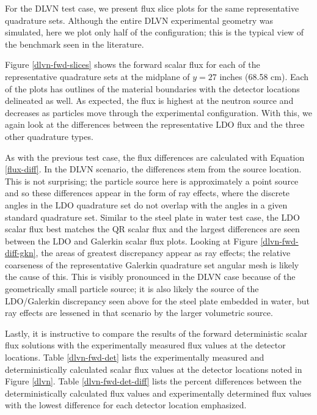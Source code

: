 \documentclass{article} %
\begin{document}
For the DLVN test case, we present flux slice plots for the same representative
quadrature sets. Although the entire DLVN
experimental geometry was simulated, here we plot only half of the
configuration; this is the typical view of the benchmark seen in the
literature.

Figure \ref{dlvn-fwd-slices} shows the forward scalar flux for each of the
representative quadrature sets at the midplane of $y = 27$ inches (68.58 cm).
Each of the plots has outlines of the material boundaries with the detector
locations delineated as well. As expected, the flux is highest at the neutron
source and decreases as particles move through the experimental configuration.
With this, we again look at the differences between the representative LDO flux
and the three other quadrature types. 

As with the previous test case, the flux differences 
are calculated with Equation \ref{flux-diff}. In the DLVN scenario, the 
differences stem from the source location. This is not surprising; the particle
source here is approximately a point source and so these differences appear in
the form of ray effects, where the discrete angles in the LDO quadrature set do
not overlap with the angles in a given standard quadrature set. Similar to the
steel plate in water test case, the LDO scalar flux best matches the QR scalar
flux and the largest differences are seen between the LDO and Galerkin scalar
flux plots. Looking at Figure \ref{dlvn-fwd-diff-gkn}, the areas of greatest
discrepancy appear as ray effects; the relative coarseness of the
representative Galerkin quadrature set angular mesh is likely the cause of
this. This is visibly pronounced in the DLVN case because of the geometrically
small particle source; it is also likely the source of the 
LDO/Galerkin discrepancy seen above for the steel plate embedded in water, but
ray effects are lessened in that scenario by the larger volumetric source.

Lastly, it is instructive to compare the results of the forward deterministic
scalar flux solutions with the experimentally measured flux values at the
detector locations. Table \ref{dlvn-fwd-det} lists the experimentally measured
\cite{dlvn1991} and deterministically calculated scalar flux values at the
detector locations noted in Figure \ref{dlvn}. Table \ref{dlvn-fwd-det-diff}
lists the percent differences between the deterministically calculated flux
values and experimentally determined flux values with the lowest difference
for each detector location emphasized.
\end{document}
